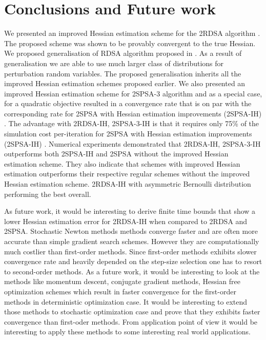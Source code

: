 \chapter{Conclusions and Future work}\label{conc}
\label{sec:conclusions}
We presented an improved Hessian estimation scheme for the 2RDSA algorithm \cite{prashanth2015rdsa}. The proposed scheme was shown to be provably convergent to the true Hessian. We proposed generalisation of RDSA algorithm proposed in \cite{prashanth2015rdsa}. As a result of generalisation we are able to use much larger class of distributions  for perturbation random variables. The proposed generalisation inherits all the improved Hessian estimation  schemes proposed earlier. We also presented an improved Hessian estimation scheme for 2SPSA-3 algorithm \cite{bhatnagar2015simultaneous} and as a special case, for a quadratic objective resulted in a  convergence rate that is on par with the corresponding rate for 2SPSA with Hessian estimation improvements (2SPSA-IH) \cite{spall-jacobian}. The advantage with 2RDSA-IH, 2SPSA-3-IH is that it requires only 75\% of the simulation cost per-iteration for 2SPSA with Hessian estimation improvements (2SPSA-IH) \cite{spall-jacobian}. Numerical experiments demonstrated that 2RDSA-IH, 2SPSA-3-IH outperforms both 2SPSA-IH and 2SPSA without the improved Hessian estimation scheme. They also indicate that schemes with improved Hessian estimation outperforms their respective regular schemes without the improved Hessian estimation scheme. 2RDSA-IH with asymmetric Bernoulli distribution performing the best overall.

As future work, it would be interesting to derive finite time bounds that show a lower Hessian estimation error for 2RDSA-IH when compared to 2RDSA and 2SPSA. Stochastic Newton methods  methods converge faster and  are often more accurate than simple gradient search schemes. However they are computationally much costlier than first-order methods. Since first-order methods exhibits slower convergence rate and heavily depended on the step-size selection one has to resort to second-order methods. As a future work, it would be interesting to look at the methods like momentum descent, conjugate gradient methods, Hessian free optimization schemes which result in faster convergence for the first-order methods in deterministic optimization case. It would be interesting to extend those methods to stochastic optimization case and prove that they exhibits  faster convergence than first-oder methods. From application point of view it would be interesting to apply these methods to some interesting real world applications.
